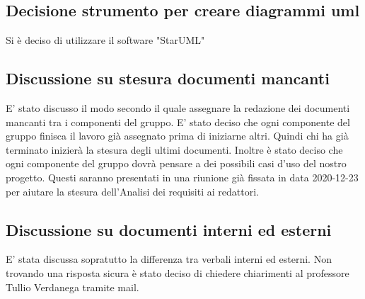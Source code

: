 \subsection*{Decisione strumento per creare diagrammi uml}
Si è deciso di utilizzare il software "StarUML"

\subsection*{Discussione su stesura documenti mancanti}
E' stato discusso il modo secondo il quale assegnare la redazione dei documenti mancanti tra i componenti del gruppo. 
E' stato deciso che ogni componente del gruppo finisca il lavoro già assegnato prima di iniziarne altri. Quindi chi ha già terminato inizierà la stesura degli ultimi documenti. 
Inoltre è stato deciso che ogni componente del gruppo dovrà pensare a dei possibili casi d'uso del nostro progetto. Questi saranno presentati in una riunione già fissata in data 2020-12-23 per aiutare la stesura dell'Analisi dei requisiti ai redattori. 		

\subsection*{Discussione su documenti interni ed esterni}
E' stata discussa sopratutto la differenza tra verbali interni ed esterni. Non trovando una risposta sicura è stato deciso di chiedere chiarimenti al professore Tullio Verdanega tramite mail.		


			





